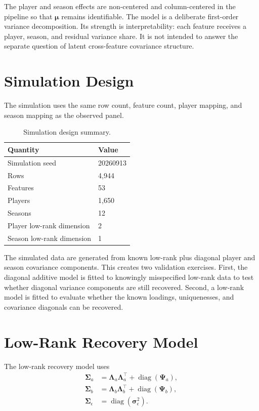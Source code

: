 \documentclass[11pt]{article}
\begin{document}
The player and season effects are non-centered and column-centered in the
pipeline so that \(\boldsymbol{\mu}\) remains identifiable. The model is a
deliberate first-order variance decomposition. Its strength is interpretability:
each feature receives a player, season, and residual variance share. It is not
intended to answer the separate question of latent cross-feature covariance
structure.

\section{Simulation Design}

The simulation uses the same row count, feature count, player mapping, and
season mapping as the observed panel.

\begin{table}[htbp]
\centering
\small
\caption{Simulation design summary.}
\label{tab:simulation-summary}
\begin{tabular}{L{0.58\textwidth}R{0.20\textwidth}}
\toprule
Quantity & Value \\
\midrule
Simulation seed & 20260913 \\
Rows & 4,944 \\
Features & 53 \\
Players & 1,650 \\
Seasons & 12 \\
Player low-rank dimension & 2 \\
Season low-rank dimension & 1 \\
\bottomrule
\end{tabular}
\end{table}

The simulated data are generated from known low-rank plus diagonal player and
season covariance components. This creates two validation exercises. First, the
diagonal additive model is fitted to knowingly misspecified low-rank data to
test whether diagonal variance components are still recovered. Second, a
low-rank model is fitted to evaluate whether the known loadings, uniquenesses,
and covariance diagonals can be recovered.

\section{Low-Rank Recovery Model}

The low-rank recovery model uses
\begin{align}
  \boldsymbol{\Sigma}_a
    &= \boldsymbol{\Lambda}_a\boldsymbol{\Lambda}_a^\top
       + \operatorname{diag}(\boldsymbol{\Psi}_a), \\
  \boldsymbol{\Sigma}_b
    &= \boldsymbol{\Lambda}_b\boldsymbol{\Lambda}_b^\top
       + \operatorname{diag}(\boldsymbol{\Psi}_b), \\
  \boldsymbol{\Sigma}_{\epsilon}
    &= \operatorname{diag}(\boldsymbol{\sigma}_{\epsilon}^{2}).
\end{align}
\end{document}
